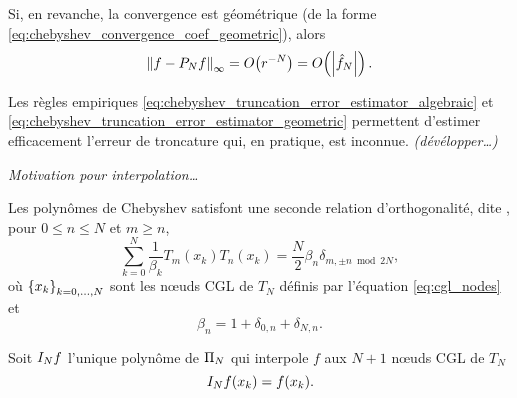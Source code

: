 Si, en revanche, la convergence est géométrique (\ie de la forme \eqref{eq:chebyshev_convergence_coef_geometric}), alors 
\begin{equation}
	\norminf{f - \truncseries{f}{N}} 
	= \bigO{r^{-N}}
	= \bigO{\left| \hat{f}_N \right|}.
	\label{eq:chebyshev_truncation_error_estimator_geometric}
\end{equation}

Les règles empiriques \eqref{eq:chebyshev_truncation_error_estimator_algebraic} et \eqref{eq:chebyshev_truncation_error_estimator_geometric} permettent d'estimer efficacement l'erreur de troncature qui, en pratique, est inconnue. \textit{(dévélopper\ldots)}

\par\bigskip
\textit{Motivation pour interpolation\ldots}

Les polynômes de Chebyshev satisfont une seconde relation d'orthogonalité, dite , pour $0 \leq n \leq N$ et $m \geq n$,
\begin{equation}
	\sum_{k=0}^{N} \frac{1}{\beta_k} T_m(x_k) T_n(x_k) = 
	\frac{N}{2} \beta_n \delta_{m,\pm n \bmod{2N}},
	\label{eq:chebyshev_discrete_orthogonality}
\end{equation}
où $\family{x}{k}{0}{N}$ sont les n\oe uds CGL de $T_N$ définis par l'équation \eqref{eq:cgl_nodes} et
\begin{equation}
	\beta_n = 
	1 + \delta_{0,n} + \delta_{N,n}.
\end{equation}

\par


Soit $\interpolant{f}{N}$ l'unique polynôme de $\polyspace{N}$ qui interpole $f$ aux $N+1$ n\oe uds CGL de $T_N$
\begin{equation}
	\interpolant{f}{N}(x_k) = f(x_k).
	\label{eq:chebyshev_interpolation_cgl}
\end{equation}

